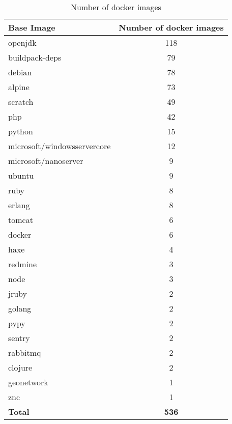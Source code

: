 \begin{table}[h]
\centering
\label{officialimgstats}
\begin{tabular}{|l | c |} 
\hline
\textbf{Base Image}         & \textbf{Number of docker images} \\\hline
openjdk                     & 118                              \\\hline
buildpack-deps              & 79                               \\\hline
debian                      & 78                               \\\hline
alpine                      & 73                               \\\hline
scratch                     & 49                               \\\hline
php                         & 42                               \\\hline
python                      & 15                               \\\hline
microsoft/windowsservercore & 12                               \\\hline
microsoft/nanoserver        & 9                                \\\hline
ubuntu                      & 9                                \\\hline
ruby                        & 8                                \\\hline
erlang                      & 8                                \\\hline
tomcat                      & 6                                \\\hline
docker                      & 6                                \\\hline
haxe                        & 4                                \\\hline
redmine                     & 3                                \\\hline
node                        & 3                                \\\hline
jruby                       & 2                                \\\hline
golang                      & 2                                \\\hline
pypy                        & 2                                \\\hline
sentry                      & 2                                \\\hline
rabbitmq                    & 2                                \\\hline
clojure                     & 2                                \\\hline
geonetwork                  & 1                                \\\hline
znc                         & 1                                \\\hline
\textbf{Total}              & \textbf{536}                     \\\hline
\end{tabular}
\caption{Number of docker images }
\end{table}

